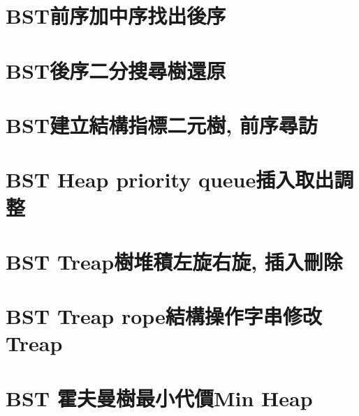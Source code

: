 \documentclass{article}
\begin{document}
\begin{multicols}{2}


\section{BST前序加中序找出後序}



\section{BST後序二分搜尋樹還原}



\section{BST建立結構指標二元樹, 前序尋訪}



\section{BST Heap priority queue插入取出調整}



\section{BST Treap樹堆積左旋右旋, 插入刪除}



\section{BST Treap rope結構操作字串修改Treap}



\section{BST 霍夫曼樹最小代價Min Heap}




\end{multicols}
\end{document}
